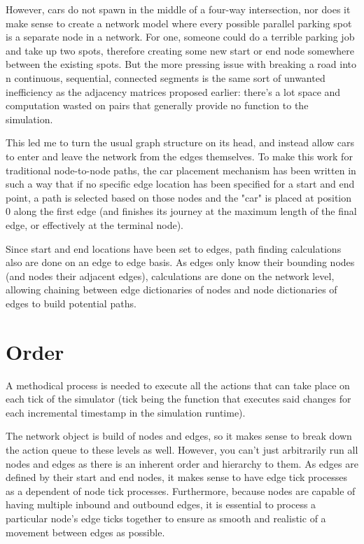 \par However, cars do not spawn in the middle of a four-way intersection, nor does it make sense to create a network model where every possible parallel parking spot is a separate node in a network.  For one, someone could do a terrible parking job and take up two spots, therefore creating some new start or end node somewhere between the existing spots.  But the more pressing issue with breaking a road into n continuous, sequential, connected segments is the same sort of unwanted inefficiency as the adjacency matrices proposed earlier:  there's a lot space and computation wasted on pairs that generally provide no function to the simulation. \\

\par This led me to turn the usual graph structure on its head, and instead allow cars to enter and leave the network from the edges themselves.  To make this work for traditional node-to-node paths, the car placement mechanism has been written in such a way that if no specific edge location has been specified for a start and end point, a path is selected based on those nodes and the "car" is placed at position 0 along the first edge (and finishes its journey at the maximum length of the final edge, or effectively at the terminal node). \\

\par Since start and end locations have been set to edges, path finding calculations also are done on an edge to edge basis.  As edges only know their bounding nodes (and nodes their adjacent edges), calculations are done on the network level, allowing chaining between edge dictionaries of nodes and node dictionaries of edges to build potential paths.


\section{Order}

\par A methodical process is needed to execute all the actions that can take place on each tick of the simulator (tick being the function that executes said changes for each incremental timestamp in the simulation runtime). \\

\par The network object is build of nodes and edges, so it makes sense to break down the action queue to these levels as well.  However, you can't just arbitrarily run all nodes and edges as there is an inherent order and hierarchy to them.  As edges are defined by their start and end nodes, it makes sense to have edge tick processes as a dependent of node tick processes.  Furthermore, because nodes are capable of having multiple inbound and outbound edges, it is essential to process a particular node's edge ticks together to ensure as smooth and realistic of a movement between edges as possible. \\

